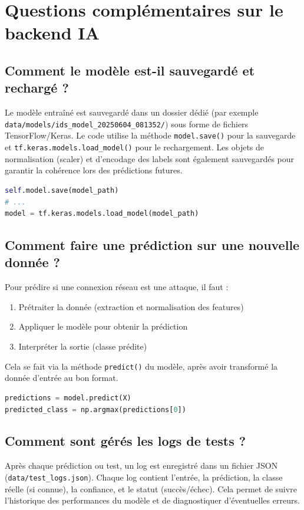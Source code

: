 \documentclass[a4paper,12pt]{article}
\begin{document}
\section{Questions complémentaires sur le backend IA}

\subsection{Comment le modèle est-il sauvegardé et rechargé ?}
Le modèle entraîné est sauvegardé dans un dossier dédié (par exemple \texttt{data/models/ids\_model\_20250604\_081352/}) sous forme de fichiers TensorFlow/Keras. Le code utilise la méthode \texttt{model.save()} pour la sauvegarde et \texttt{tf.keras.models.load\_model()} pour le rechargement. Les objets de normalisation (scaler) et d'encodage des labels sont également sauvegardés pour garantir la cohérence lors des prédictions futures.

\begin{lstlisting}[language=Python]
self.model.save(model_path)
# ...
model = tf.keras.models.load_model(model_path)
\end{lstlisting}

\subsection{Comment faire une prédiction sur une nouvelle donnée ?}
Pour prédire si une connexion réseau est une attaque, il faut :
\begin{enumerate}
  \item Prétraiter la donnée (extraction et normalisation des features)
  \item Appliquer le modèle pour obtenir la prédiction
  \item Interpréter la sortie (classe prédite)
\end{enumerate}
Cela se fait via la méthode \texttt{predict()} du modèle, après avoir transformé la donnée d'entrée au bon format.

\begin{lstlisting}[language=Python]
predictions = model.predict(X)
predicted_class = np.argmax(predictions[0])
\end{lstlisting}

\subsection{Comment sont gérés les logs de tests ?}
Après chaque prédiction ou test, un log est enregistré dans un fichier JSON (\texttt{data/test\_logs.json}). Chaque log contient l'entrée, la prédiction, la classe réelle (si connue), la confiance, et le statut (succès/échec). Cela permet de suivre l'historique des performances du modèle et de diagnostiquer d'éventuelles erreurs.
\end{document}
